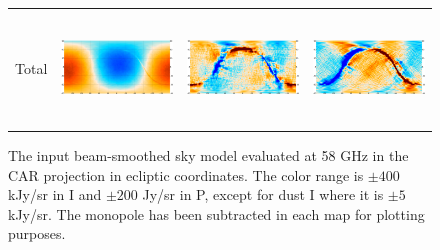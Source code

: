 \documentclass{article}
\begin{document}
\begin{figure}
\begin{tabular}{rm{56mm}m{54.4mm}m{56mm}}
		Total &
		\includegraphics[height=29.7mm,clip,trim=0 0mm 7.5mm 0]{plots/sim_freqmap_58GHz_0_0.png} &
		\includegraphics[height=29.7mm,clip,trim=7.5mm 0mm 7.5mm 0]{plots/sim_freqmap_58GHz_0_1.png} &
		\includegraphics[height=29.7mm,clip,trim=7.5mm 0mm 0 0]{plots/sim_freqmap_58GHz_0_2.png}
	\end{tabular}
	\caption{The input beam-smoothed sky model evaluated at 58 GHz in the CAR
	projection in ecliptic coordinates. The color range is
	$\pm 400$ kJy/sr in I and $\pm 200$ Jy/sr in P, except for dust I where it is
	$\pm 5$ kJy/sr. The monopole has been subtracted in each map for plotting purposes.}
	\label{fig:model}
\end{figure}
\end{document}
